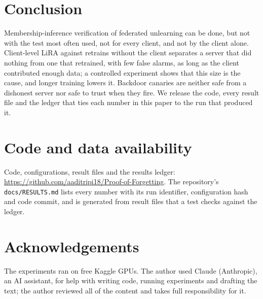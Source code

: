 \documentclass[11pt]{article}
\begin{document}
\section{Conclusion}

Membership-inference verification of federated unlearning can be done, but not
with the test most often used, not for every client, and not by the client
alone. Client-level LiRA against retrains without the client separates a
server that did nothing from one that retrained, with few false alarms, as long
as the client contributed enough data; a controlled experiment shows that this
size is the cause, and longer training lowers it. Backdoor canaries are
neither safe from a dishonest server nor safe to trust when they fire. We
release the code, every result file and the ledger that ties each number in
this paper to the run that produced it.

\section*{Code and data availability}

Code, configurations, result files and the results ledger:
\url{https://github.com/aaditripi18/Proof-of-Forgetting}. The repository's
\texttt{docs/RESULTS.md} lists every number with its run identifier,
configuration hash and code commit, and is generated from result files that a
test checks against the ledger.

\section*{Acknowledgements}

The experiments ran on free Kaggle GPUs. The author used Claude (Anthropic), an
AI assistant, for help with writing code, running experiments and drafting the
text; the author reviewed all of the content and takes full responsibility for
it.
\end{document}
